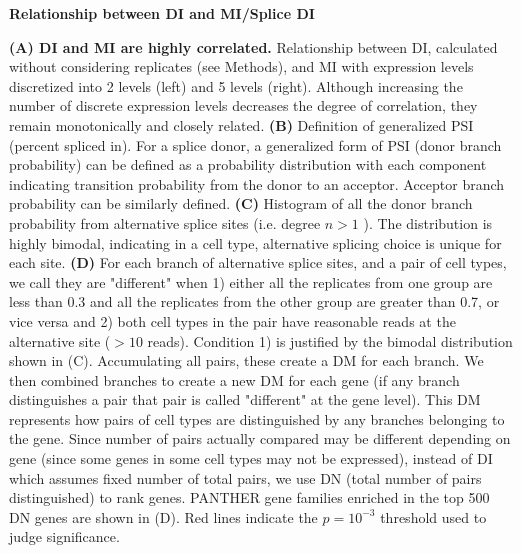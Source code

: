 \textbf{Relationship between DI and MI/Splice DI}

\textbf{(A) DI and MI are highly correlated.} Relationship between DI, calculated without considering replicates (see Methods), and MI with expression levels discretized into 2 levels (left) and 5 levels (right). Although increasing the number of discrete expression levels decreases the degree of correlation, they remain monotonically and closely related.
\textbf{(B)} Definition of generalized PSI (percent spliced in). For a splice donor, a generalized form of PSI (donor branch probability) can be defined as a probability distribution with each component indicating transition probability from the donor to an acceptor. Acceptor branch probability can be similarly defined. 
\textbf{(C)} Histogram of all the donor branch probability from alternative splice sites (i.e. degree $n > 1$ ). The distribution is highly bimodal, indicating in a cell type, alternative splicing choice is unique for each site. 
\textbf{(D)} For each branch of alternative splice sites, and a pair of cell types, we call they are "different" when 1) either all the replicates from one group are less than 0.3 and all the replicates from the other group are greater than 0.7, or vice versa and 2) both cell types in the pair have reasonable reads at the alternative site ($>10$ reads). Condition 1) is justified by the bimodal distribution shown in (C). Accumulating all pairs, these create a DM for each branch. We then combined branches to create a new DM for each gene (if any branch distinguishes a pair that pair is called "different" at the gene level). This DM represents how pairs of cell types are distinguished by any branches belonging to the gene. Since number of pairs actually compared may be different depending on gene (since some genes in some cell types may not be expressed), instead of DI which assumes fixed number of total pairs, we use DN (total number of pairs distinguished) to rank genes. PANTHER gene families enriched in the top 500 DN genes are shown in (D). Red lines indicate the $p=10^{-3}$ threshold used to judge significance.
